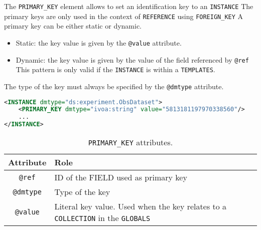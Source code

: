 The \texttt{PRIMARY\_KEY} element allows to set an identification key to an \texttt{INSTANCE}  The primary keys are only used in the context of \texttt{REFERENCE}  using \texttt{FOREIGN\_KEY} 
A primary key can be either static or dynamic.

\begin{itemize}
    \item Static: the key value is given by the \texttt{@value} attribute.
    \item Dynamic: the key value is given by the value of the field referenced by \texttt{@ref}  
    This pattern is only valid if the \texttt{INSTANCE} is within a \texttt{TEMPLATES}. 
\end{itemize}

The type of the key must always be specified by the \texttt{@dmtype} attribute. 

\begin{lstlisting}[caption={The \texttt{INSTANCE} is identified within a \texttt{COLLECTION} by the \texttt{PRIMARY\_KEY} value (see line~\ref{PRIMARY_KEY_snippet} in Appendix~\ref{appendix_A}).},language=XML]
<INSTANCE dmtype="ds:experiment.ObsDataset">
    <PRIMARY_KEY dmtype="ivoa:string" value="5813181197970338560"/>
    ...
</INSTANCE>
\end{lstlisting}

\begin{table}[!htbp]
\small
\centering
\begin{tabulary}{\linewidth}{|c|J|}       
       \hline 
            \textbf{Attribute} & 
            \textbf {Role}\\
       \hline         \hline  
            \texttt{@ref} &
            ID of the FIELD used as primary key \\
        \hline 
            \texttt{@dmtype} & 
            Type of the key \\
        \hline 
            \texttt{@value} & 
            Literal key value. Used when the key relates to a \texttt{COLLECTION} in the \texttt{GLOBALS} \\
        \hline 
     \end{tabulary}
     \caption{\texttt{PRIMARY\_KEY} attributes.} 
     \label{tbl:primarykey-att}
 \end{table}

